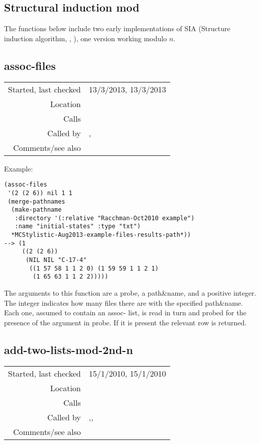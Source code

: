 \subsection{Structural induction mod}\label{sec:structural-induction-mod}

The functions below include two early implementations
of SIA (Structure induction algorithm,
\citeauthor{meredith2002}, \citeyear{meredith2002}),
one version working modulo $n$.


\subsection*{assoc-files}\label{fun:assoc-files}

\vspace{0.3cm}
\begin{tabular}{r|p{8cm}}
Started, last checked & 13/3/2013, 13/3/2013 \\
Location & \nameref{sec:structural-induction-mod} \\
Calls & \nameref{fun:read-from-file} \\
Called by & \nameref{fun:SIA-reflected}, \nameref{fun:SIA-reflected-mod-2nd-n} \\
Comments/see also &
\end{tabular}

\vspace{0.5cm}
\noindent Example:
\begin{verbatim}
(assoc-files
 '(2 (2 6)) nil 1 1
 (merge-pathnames
  (make-pathname
   :directory '(:relative "Racchman-Oct2010 example")
   :name "initial-states" :type "txt")
  *MCStylistic-Aug2013-example-files-results-path*))
--> (1
     ((2 (2 6))
      (NIL NIL "C-17-4"
       ((1 57 58 1 1 2 0) (1 59 59 1 1 2 1)
        (1 65 63 1 1 2 2)))))
\end{verbatim}

\noindent The arguments to this function are a probe,
a path\&name, and a positive integer. The integer
indicates how many files there are with the specified
path\&name. Each one, assumed to contain an assoc-
list, is read in turn and probed for the presence of
the argument in probe. If it is present the relevant
row is returned.


\subsection*{add-two-lists-mod-2nd-n}\label{fun:add-two-lists-mod-2nd-n}

\vspace{0.3cm}
\begin{tabular}{r|p{8cm}}
Started, last checked & 15/1/2010, 15/1/2010 \\
Location & \nameref{sec:structural-induction-mod} \\
Calls & \nameref{fun:add-two-lists} \\
Called by & \nameref{fun:maximal-translatable-pattern-mod-2nd-n},\newline \nameref{fun:test-equal<potential-translator-mod-2nd-n}, \nameref{fun:translation-mod-2nd-n} \\
Comments/see also &
\end{tabular}

